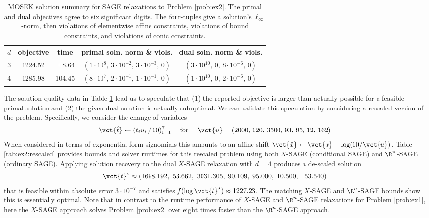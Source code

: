 \begin{table}[ht!]
    \caption{MOSEK solution summary for SAGE relaxations to Problem \eqref{prob:ex2}. The primal and dual objectives agree to six significant digits. The four-tuples give a solution's $\ell_{\infty}$-norm, then violations of elementwise affine constraints, violations of bound constraints, and violations of conic constraints.}
    \centering
    \begin{tabular}{ccccc} %
    $d$ & objective & time & primal soln. norm \& viols. & dual soln. norm \& viols.  \\ \hline
      3 & 1224.52 & \textcolor{white}{00}8.64 & $(1\cdot 10^{8},\, 3\cdot 10^{-2},\, 3\cdot 10^{-3},\, 0)$ & $(3\cdot 10^{10},\, 0,\, 8\cdot 10^{-6},\, 0)$  \\
      4 & 1285.98 & 104.45 & $(8\cdot 10^{7},\, 2\cdot 10^{-1},\, 1\cdot 10^{-1},\, 0)$ & $(1\cdot 10^{10},\, 0,\, 2\cdot 10^{-6},\, 0)$ \\
    \end{tabular}
    \label{tab:ex2:original}
\end{table}

The solution quality data in Table \ref{tab:ex2:original} lead us to speculate that (1) the reported objective is larger than actually possible for a feasible primal solution and (2) the given dual solution is actually suboptimal.
We can validate this speculation by considering a rescaled version of the problem.
Specifically, we consider the change of variables
\[
    \vct{\hat{t}} \leftarrow (t_i u_i\,/\,10)_{i=1}^7 \quad \text{ for } \quad \vct{u} = (2000,\, 120,\, 3500,\, 93,\, 95,\, 12,\, 162)
\]
When considered in terms of exponential-form signomials this amounts to an affine shift $\vct{\hat{x}} \leftarrow \vct{x} - \log(10/\vct{u})$.
Table \ref{tab:ex2:rescaled} provides bounds and solver runtimes for this rescaled problem using both $X$-SAGE (conditional SAGE) and $\R^n$-SAGE (ordinary SAGE).
Applying solution recovery to the dual $X$-SAGE relaxation with $d=4$ produces a de-scaled solution
\[
    \vct{t}^\star \approx (1698.192,~  53.662,~ 3031.305,~   90.109,~   95.000,~   10.500,~  153.540)
\]
that is feasible within absolute error $3 \cdot 10^{-7}$ and satisfies $f(\log \vct{t}^\star) \approx 1227.23$.
The matching $X$-SAGE and $\R^n$-SAGE bounds show this is essentially optimal.
Note that in contrast to the runtime performance of $X$-SAGE and $\R^n$-SAGE relaxations for Problem \eqref{prob:ex1}, here the $X$-SAGE approach solves Problem \eqref{prob:ex2} over eight times faster than the $\R^n$-SAGE approach.

